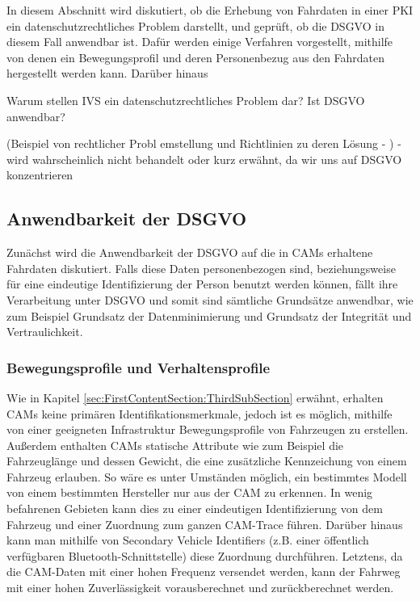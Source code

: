 In diesem Abschnitt wird diskutiert, ob die Erhebung von Fahrdaten in einer PKI ein datenschutzrechtliches Problem darstellt, und geprüft, ob die DSGVO in diesem Fall anwendbar ist. Dafür werden einige Verfahren vorgestellt, mithilfe von denen ein Bewegungsprofil und deren Personenbezug aus den Fahrdaten hergestellt werden kann. Darüber hinaus 

Warum stellen IVS ein datenschutzrechtliches Problem dar? Ist DSGVO anwendbar? 

(Beispiel von rechtlicher Probl	emstellung und Richtlinien zu deren Lösung - \cite{EUCooperativeV2X} ) - wird wahrscheinlich nicht behandelt oder kurz erwähnt, da wir uns auf DSGVO konzentrieren

\subsection{Anwendbarkeit der DSGVO}
\label{sec:SecondContentSection:SecondSubsection}

Zunächst wird die Anwendbarkeit der DSGVO auf die in CAMs erhaltene Fahrdaten diskutiert. Falls diese Daten personenbezogen sind, beziehungsweise für eine eindeutige Identifizierung der Person benutzt werden können, fällt ihre Verarbeitung unter DSGVO und somit sind sämtliche Grundsätze anwendbar, wie zum Beispiel Grundsatz der Datenminimierung und Grundsatz der Integrität und Vertraulichkeit. 

\subsubsection{Bewegungsprofile und Verhaltensprofile}
\label{sec:SecondContentSection:SecondSubsection:FirstSubSubsection}

Wie in Kapitel \ref{sec:FirstContentSection:ThirdSubSection} erwähnt, erhalten CAMs keine primären Identifikationsmerkmale, jedoch ist es möglich, mithilfe von einer geeigneten Infrastruktur Bewegungsprofile von Fahrzeugen zu erstellen. Außerdem enthalten CAMs statische Attribute wie zum Beispiel die Fahrzeuglänge und dessen Gewicht, die eine zusätzliche Kennzeichung von einem Fahrzeug erlauben. So wäre es unter Umständen möglich, ein bestimmtes Modell von einem bestimmten Hersteller nur aus der CAM zu erkennen. In wenig befahrenen Gebieten kann dies zu einer eindeutigen Identifizierung von dem Fahrzeug und einer Zuordnung zum ganzen CAM-Trace führen. Darüber hinaus kann man mithilfe von Secondary Vehicle Identifiers (z.B. einer öffentlich verfügbaren Bluetooth-Schnittstelle) diese Zuordnung durchführen. Letztens, da die CAM-Daten mit einer hohen Frequenz versendet werden, kann der Fahrweg mit einer hohen Zuverlässigkeit vorausberechnet und zurückberechnet werden. 

